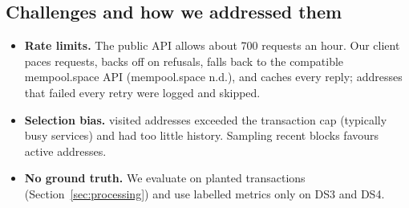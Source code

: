 \subsection{Challenges and how we addressed them}

\begin{itemize}
  \item \textbf{Rate limits.} The public API allows about 700 requests an hour. Our client paces requests, backs
    off on refusals, falls back to the compatible mempool.space API (mempool.space n.d.), and caches every
    reply;  addresses that failed every retry were logged and skipped.
  \item \textbf{Selection bias.}  visited addresses exceeded the transaction cap (typically busy
    services) and  had too little history. Sampling recent blocks favours active addresses.
  \item \textbf{No ground truth.} We evaluate on planted transactions (Section~\ref{sec:processing}) and use
    labelled metrics only on DS3 and DS4.
\end{itemize}
